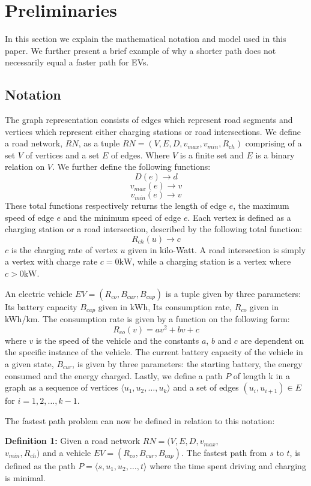 \section{Preliminaries} \label{sec:notation}
In this section we explain the mathematical notation and model used in this paper. We further present a brief example of why a shorter path does not necessarily equal a faster path for EVs. 

\subsection{Notation}
The graph representation consists of edges which represent road segments and vertices which represent either charging stations or road intersections. We define a road network, $RN$, as a tuple $RN=(V,E,D,v_{max},v_{min},R_{ch})$ comprising of a set $V$ of vertices and a set $E$ of edges. Where $V$ is a finite set and $E$ is a binary relation on $V$. We further define the following functions:
\[ D(e)\rightarrow d \] 
\[ v_{max}(e)\rightarrow v \]
\[ v_{min}(e)\rightarrow v \]
These total functions respectively returns the length of edge $e$, the maximum speed of edge $e$ and the minimum speed of edge $e$. Each vertex is defined as a charging station or a road intersection, described by the following total function:
\[R_{ch}(u)\rightarrow c\]
$c$ is the charging rate of vertex $u$ given in kilo-Watt. A road intersection is simply a vertex with charge rate $c = 0\si{\kW}$, while a charging station is a vertex where $c > 0\si{\kW}$. 

An electric vehicle $EV=(R_{co},B_{cur},B_{cap})$ is a tuple given by three parameters: Its battery capacity $B_{cap}$ given in $\si{\kWh}$, Its consumption rate, $R_{co}$ given in kWh/km. The consumption rate is given by a function on the following form:
\[ R_{co}(v)=av^2+bv+c \]
where $v$ is the speed of the vehicle and the constants $a$, $b$ and $c$ are dependent on the specific instance of the vehicle. The current battery capacity of the vehicle in a given state, $B_{cur}$, is given by three parameters: the starting battery, the energy consumed and the energy charged. Lastly, we define a path $P$ of length k in a graph as a sequence of vertices $\langle u_1,u_2,\dots,u_k \rangle$ and a set of edges $(u_{i},u_{i+1})\in E$ for $i=1,2,\dots,k-1$.

The fastest path problem can now be defined in relation to this notation:

\textbf{Definition 1:} Given a road network $RN=(V,E,D,v_{max},$\\ 
$v_{min},R_{ch})$ and a vehicle $EV=(R_{co},B_{cur},B_{cap})$. The fastest path 
from $s$ to $t$, is defined as the path $P = \langle s,u_1,u_2,\dots,t \rangle$ where the time spent driving and charging is minimal. 
 



